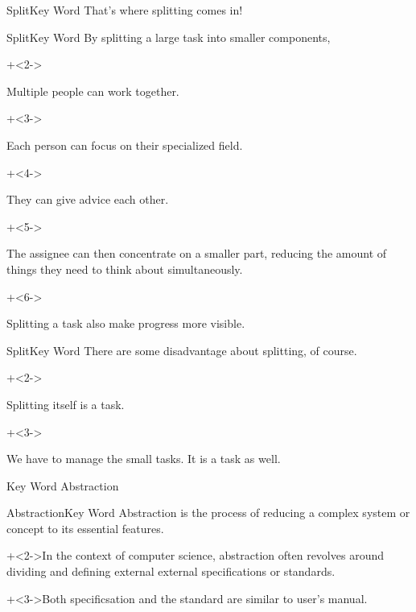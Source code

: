 \begin{frame}{Split}{Key Word}
    {\Large That's where splitting comes in!}
\end{frame}


\begin{frame}{Split}{Key Word}
    By splitting a large task into smaller components,
    \vspace{4ex}

    \begin{itemize}
        \onslide+<2->{\item Multiple people can work together.
            \begin{itemize}
                \onslide+<3->{\item Each person can focus on their specialized field.}
                \onslide+<4->{\item They can give advice each other.}
            \end{itemize}}
        \onslide+<5->{\item The assignee can then concentrate on a smaller part, reducing the amount of things they need to think about simultaneously.}
        \onslide+<6->{\item Splitting a task also make progress more visible.}
    \end{itemize}
\end{frame}


\begin{frame}{Split}{Key Word}
    There are some disadvantage about splitting, of course.
    \vspace{4ex}

    \begin{itemize}
        \onslide+<2->{\item Splitting itself is a task.}
        \onslide+<3->{\item We have to manage the small tasks. It is a task as well.}
    \end{itemize}
\end{frame}


\begin{frame}{Key Word}{}
    {\Huge Abstraction}
\end{frame}


\begin{frame}{Abstraction}{Key Word}
    Abstraction is the process of reducing a complex system or concept to its essential features.
    \vspace{4ex}

    \onslide+<2->{In the context of computer science, abstraction often revolves around dividing and defining external external specifications or standards.}
    \vspace{2ex}

    \onslide+<3->{Both specificsation and the standard are similar to user's manual.}
\end{frame}


